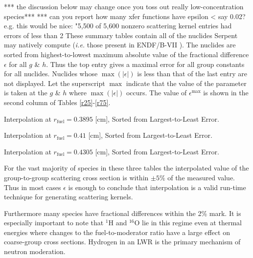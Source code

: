 \documentclass{physor2012}
\newcommand{\superscript}[1]{\ensuremath{^{\textrm{#1}}}}
\newcommand{\nuc}[2]{\superscript{#2}{#1}}
\begin{document}
 *** the discussion below may change once you toss out really low-concentration species***
 *** can you report how many xfer functions have epsilon < say 0.02?  e.g. this would be nice:  "5,500 of 5,600 nonzero scattering kernel entries had errors of less than 2%
These summary tables contain all of the nuclides Serpent may natively compute
(\emph{i.e.} those present in ENDF/B-VII \cite{}).  The nuclides are sorted from
highest-to-lowest maximum absolute value of the fractional difference $\epsilon$
for all $g$ \& $h$.  Thus the top entry gives a maximal error for all group
constants for all nuclides.  Nuclides whose $\max(|\epsilon|)$ is less than
that of the last entry are not displayed.  Let the superscript $\max$ indicate that the
value of the parameter is taken at the $g$ \& $h$ where $\max(|\epsilon|)$ occurs.
The value of $\epsilon^{\max}$ is shown in the second column of Tables \ref{r25}-\ref{r75}.
\begin{table}[htbp]
\begin{center}
\caption{Interpolation at $r_{\mbox{fuel}}=0.3895$ [cm], Sorted from Largest-to-Least Error.}
\label{r25}

\end{center}
\end{table}

\begin{table}[htbp]
\begin{center}
\caption{Interpolation at $r_{\mbox{fuel}}=0.41$ [cm], Sorted from Largest-to-Least Error.}
\label{r50}

\end{center}
\end{table}

\begin{table}[htbp]
\begin{center}
\caption{Interpolation at $r_{\mbox{fuel}}=0.4305$ [cm], Sorted from Largest-to-Least Error.}
\label{r75}

\end{center}
\end{table}

For the vast majority of species in these three tables the interpolated value of
the group-to-group scattering cross section is within $\pm 5\%$ of the measured
value.  Thus in most cases $\epsilon$ is enough to conclude that interpolation
is a valid run-time technique for generating scattering kernels.

Furthermore many species have fractional differences within the 2\% mark.
It is especially important to note that \nuc{H}{1} and \nuc{O}{16} lie in
this regime even at thermal energies where changes to the fuel-to-moderator ratio have a large effect on coarse-group cross sections.  Hydrogen in an LWR is the primary mechanism of neutron
moderation.  
\end{document}
